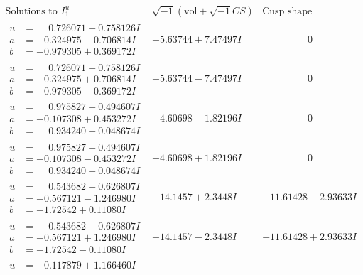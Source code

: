 \documentclass[1p]{elsarticle_modified}
\theoremstyle{definition}
\newcommand{\I}{\sqrt{-1}}
\begin{document}
$$\begin{array}{c|c|c}  
\text{Solutions to }I^u_{1}& \I (\text{vol} + \sqrt{-1}CS) & \text{Cusp shape}\\
 \hline 
\begin{aligned}
u &= \phantom{-}0.726071 + 0.758126 I \\
a &= -0.324975 - 0.706814 I \\
b &= -0.979305 + 0.369172 I\end{aligned}
 & -5.63744 + 7.47497 I & \phantom{-0.000000 } 0 \\ \hline\begin{aligned}
u &= \phantom{-}0.726071 - 0.758126 I \\
a &= -0.324975 + 0.706814 I \\
b &= -0.979305 - 0.369172 I\end{aligned}
 & -5.63744 - 7.47497 I & \phantom{-0.000000 } 0 \\ \hline\begin{aligned}
u &= \phantom{-}0.975827 + 0.494607 I \\
a &= -0.107308 + 0.453272 I \\
b &= \phantom{-}0.934240 + 0.048674 I\end{aligned}
 & -4.60698 - 1.82196 I & \phantom{-0.000000 } 0 \\ \hline\begin{aligned}
u &= \phantom{-}0.975827 - 0.494607 I \\
a &= -0.107308 - 0.453272 I \\
b &= \phantom{-}0.934240 - 0.048674 I\end{aligned}
 & -4.60698 + 1.82196 I & \phantom{-0.000000 } 0 \\ \hline\begin{aligned}
u &= \phantom{-}0.543682 + 0.626807 I \\
a &= -0.567121 - 1.246980 I \\
b &= -1.72542 + 0.11080 I\end{aligned}
 & -14.1457 + 2.3448 I & -11.61428 - 2.93633 I \\ \hline\begin{aligned}
u &= \phantom{-}0.543682 - 0.626807 I \\
a &= -0.567121 + 1.246980 I \\
b &= -1.72542 - 0.11080 I\end{aligned}
 & -14.1457 - 2.3448 I & -11.61428 + 2.93633 I \\ \hline\begin{aligned}
u &= -0.117879 + 1.166460 I \\

\end{aligned}
\end{array}$$
\end{document}
